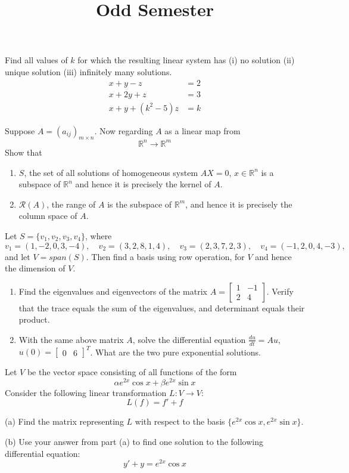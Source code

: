 \documentclass[11pt]{article}
\title{Odd Semester}
\begin{document}
 
\begin{questions}
\question  Find all values of $k$ for which the resulting linear system has (i) no solution (ii) unique solution (iii) infinitely many solutions.
	\begin{eqnarray*}
	x + y -z &=2 \\
	x+ 2y +z &=3 \\
	x+y+(k^2-5)z &=k
	\label{eq:eq1}
	\end{eqnarray*}
	
\question Suppose $A=(a_{ij})_{m \times n}$. Now regarding $A$ as a linear map from \[\mathbb{R}^n \rightarrow \mathbb{R}^m\]
	Show that 
	
	\begin{enumerate}
		\item $S$, the set of all solutions of homogeneous system $AX=0$, $x\in \mathbb{R}^n$ is a subspace of $\mathbb{R}^n$ and hence it is precisely the kernel of $A$.
		\item $\mathcal{R}(A)$, the range of $A$ is the subspace of $\mathbb{R}^m$, and hence it is precisely the column space of $A$.
	\end{enumerate}
 \question  Let $S=\{v_1, v_2, v_3, v_4\}$, where 
\[v_1=(1,-2,0,3,-4), \quad v_2=(3,2,8,1,4), \quad v_3=(2,3,7,2,3), \quad v_4=(-1,2,0,4,-3), \quad \]
and let $V=span(S)$. Then find a basis using row operation, for $V$ and hence the dimension of $V$.

\question 
\begin{enumerate}
	\item 
Find the eigenvalues and eigenvectors of the matrix 
$A=
\begin{bmatrix}
1 & -1 \\ 2 & 4
\end{bmatrix}
$. 
Verify that the trace equals the sum of the eigenvalues, and determinant equals their product.
\item 
With the same above matrix $A$, solve the differential equation $\displaystyle \frac{du}{dt} = Au$, $u(0)= {\begin{bmatrix}0 & 6 \end{bmatrix}}^T$. What are the two pure exponential solutions.
\end{enumerate}
\question
Let $V$ be the vector space consisting of all functions of the form
\[\alpha e^{2x} \cos x + \beta e^{2x} \sin x\]
Consider the following linear transformation $L : V \to V$:
\[L(f) = f' + f\]

(a) Find the matrix representing $L$ with respect to the basis $\{e^{2x}\cos x, e^{2x}\sin x\}$.

(b) Use your answer from part (a) to find one solution to the following differential equation:
 \[y' + y = e^{2x}\cos x\]

\end{questions}
\end{document}
